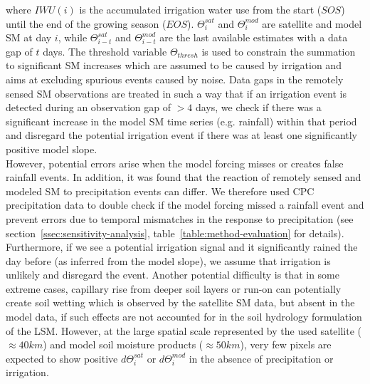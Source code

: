 \documentclass[hess, manuscript]{copernicus}
\begin{document}
where $IWU(i)$ is the accumulated irrigation water use from the start ($SOS$) until the end of the growing season ($EOS$). $\Theta^{sat}_{i}$ and $\Theta^{mod}_{i}$ are satellite and model SM at day $i$, while $\Theta^{sat}_{i-t}$ and $\Theta^{mod}_{i-t}$ are the last available estimates with a data gap of $t$ days. The threshold variable $\Theta_{thresh}$ is used to constrain the summation to significant SM increases which are assumed to be caused by irrigation and aims at excluding spurious events caused by noise. Data gaps in the remotely sensed SM observations are treated in such a way that if an irrigation event is detected during an observation gap of $>4$ days, we check if there was a significant increase in the model SM time series (e.g. rainfall) within that period and disregard the potential irrigation event if there was at least one significantly positive model slope.\\

However, potential errors arise when the model forcing misses or creates false rainfall events. In addition, it was found that the reaction of remotely sensed and modeled SM to precipitation events can differ. We therefore used CPC precipitation data to double check if the model forcing missed a rainfall event and prevent errors due to temporal mismatches in the response to precipitation (see section~\ref{ssec:sensitivity-analysis}, table~\ref{table:method-evaluation} for details). Furthermore, if we see a potential irrigation signal and it significantly rained the day before (as inferred from the model slope), we assume that irrigation is unlikely and disregard the event. Another potential difficulty is that in some extreme cases, capillary rise from deeper soil layers or run-on can potentially create soil wetting which is observed by the satellite SM data, but absent in the model data, if such effects are not accounted for in the soil hydrology formulation of the LSM. However, at the large spatial scale represented by the used satellite ($\approx 40 km$) and model soil moisture products ($\approx 50 km$), very few pixels are expected to show positive $d\Theta^{sat}_{i}$ or $d\Theta^{mod}_{i}$ in the absence of precipitation or irrigation.

\end{document}
